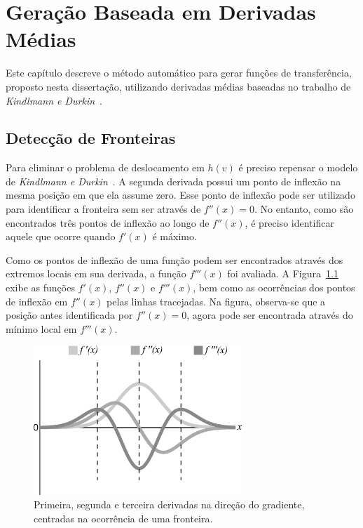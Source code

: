 
\chapter{Geração Baseada em Derivadas Médias}
\label{ch:my}
	Este capítulo descreve o método automático para gerar funções de transferência, proposto nesta dissertação, utilizando derivadas médias baseadas no trabalho de \textit{Kindlmann e Durkin}~\cite{gordon}.

\section{Detecção de Fronteiras}
\label{sec:my.deriv}
	Para eliminar o problema de deslocamento em $ h(v) $ é preciso repensar o modelo de \textit{Kindlmann e Durkin}~\cite{gordon}. A segunda derivada possui um ponto de inflexão na mesma posição em que ela assume zero. Esse ponto de inflexão pode ser utilizado para identificar a fronteira sem ser através de $ f''(x) = 0 $. No entanto, como são encontrados três pontos de inflexão ao longo de $ f''(x) $, é preciso identificar aquele que ocorre quando $ f'(x) $ é máximo.
	
	Como os pontos de inflexão de uma função podem ser encontrados através dos extremos locais em sua derivada, a função $ f'''(x) $ foi avaliada. A Figura~\ref{fig:m_inflection} exibe as funções $ f'(x) $, $ f''(x) $ e $ f'''(x) $, bem como as ocorrências dos pontos de inflexão em $ f''(x) $ pelas linhas tracejadas. Na figura, observa-se que a posição antes identificada por $ f''(x) = 0 $, agora pode ser encontrada através do mínimo local em $ f'''(x) $. 
	
\begin{figure}[h]
	\centering
	\includegraphics[width=0.7\textwidth]{images/m_inflection}
	\caption{Primeira, segunda e terceira derivadas na direção do gradiente, centradas na ocorrência de uma fronteira.}
	\label{fig:m_inflection}
\end{figure}

